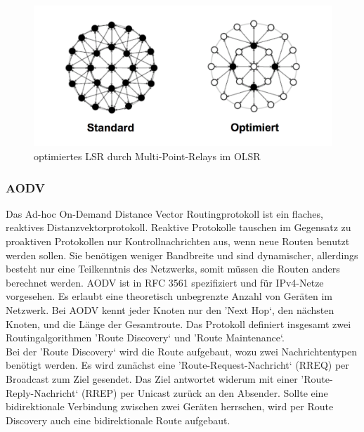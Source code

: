 \begin{figure}[H] 
	\centering
	\includegraphics[scale=0.5]{Bilder/olsr}
	\caption{optimiertes LSR durch Multi-Point-Relays im OLSR\cite{d:timm}}
	\label{f:olsr}
\end{figure}

\subsubsection{AODV}\label{ss:AODV}

Das Ad-hoc On-Demand Distance Vector Routingprotokoll ist ein flaches, reaktives Distanzvektorprotokoll. Reaktive Protokolle tauschen im Gegensatz zu proaktiven Protokollen nur Kontrollnachrichten aus, wenn neue Routen benutzt werden sollen. Sie benötigen weniger Bandbreite und sind dynamischer, allerdings besteht nur eine Teilkenntnis des Netzwerks, somit müssen die Routen anders berechnet werden.\newpage
AODV ist in RFC 3561 spezifiziert und für IPv4-Netze vorgesehen. Es erlaubt eine theoretisch unbegrenzte Anzahl von Geräten im Netzwerk. Bei AODV  kennt jeder Knoten nur den 'Next Hop‘, den nächsten Knoten, und die Länge der Gesamtroute. Das Protokoll definiert insgesamt zwei Routingalgorithmen 'Route Discovery‘ und 'Route Maintenance‘.  \\

Bei der 'Route Discovery‘ wird die Route aufgebaut, wozu zwei Nachrichtentypen benötigt werden. Es wird zunächst eine 'Route-Request-Nachricht‘ (RREQ) per Broadcast zum Ziel gesendet. Das Ziel antwortet widerum mit einer 'Route-Reply-Nachricht‘ (RREP) per Unicast zurück an den Absender. Sollte eine bidirektionale Verbindung zwischen zwei Geräten herrschen, wird per Route Discovery auch eine bidirektionale Route aufgebaut. \\


